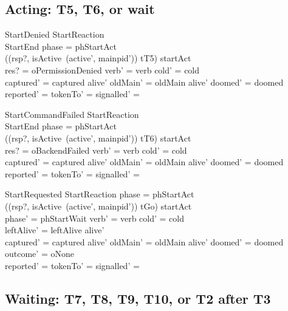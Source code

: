 \documentclass[a4paper,10pt,fleqn]{article}
\begin{document}
\subsection{Acting: T5, T6, or wait}

\begin{schema}{StartDenied}
  StartReaction \\
  StartEnd
\where
  phase = phStartAct \\
  ((rsp?, isActive~(active', mainpid')) \mapsto tT5) \in startAct \\
  res? = oPermissionDenied \land verb' = verb \land cold' = cold \\
  captured' = captured \cap alive' \land oldMain' = oldMain \cap alive' \land
    doomed' = doomed \\
  reported' = \emptyset \land tokenTo' = \emptyset \land
    signalled' = \emptyset
\end{schema}

\begin{schema}{StartCommandFailed}
  StartReaction \\
  StartEnd
\where
  phase = phStartAct \\
  ((rsp?, isActive~(active', mainpid')) \mapsto tT6) \in startAct \\
  res? = oBackendFailed \land verb' = verb \land cold' = cold \\
  captured' = captured \cap alive' \land oldMain' = oldMain \cap alive' \land
    doomed' = doomed \\
  reported' = \emptyset \land tokenTo' = \emptyset \land
    signalled' = \emptyset
\end{schema}

\begin{schema}{StartRequested}
  StartReaction
\where
  phase = phStartAct \\
  ((rsp?, isActive~(active', mainpid')) \mapsto tGo) \in startAct \\
  phase' = phStartWait \land verb' = verb \land cold' = cold \\
  leftAlive' = leftAlive \cap alive' \\
  captured' = captured \cap alive' \land oldMain' = oldMain \cap alive' \land
    doomed' = doomed \\
  outcome' = oNone \\
  reported' = \emptyset \land tokenTo' = \emptyset \land
    signalled' = \emptyset
\end{schema}

\subsection{Waiting: T7, T8, T9, T10, or T2 after T3}
\end{document}

